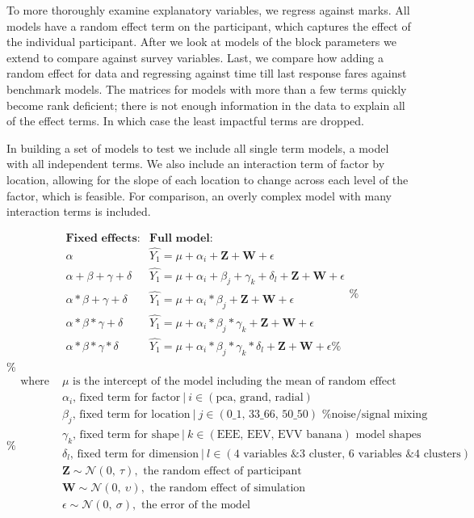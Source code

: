 \documentclass{monashthesis}
\begin{document}
To more thoroughly examine explanatory variables, we regress against marks. All models have a random effect term on the participant, which captures the effect of the individual participant. After we look at models of the block parameters we extend to compare against survey variables. Last, we compare how adding a random effect for data and regressing against time till last response fares against benchmark models. The matrices for models with more than a few terms quickly become rank deficient; there is not enough information in the data to explain all of the effect terms. In which case the least impactful terms are dropped.

In building a set of models to test we include all single term models, a model with all independent terms. We also include an interaction term of factor by location, allowing for the slope of each location to change across each level of the factor, which is feasible. For comparison, an overly complex model with many interaction terms is included.

\[
\begin{array}{ll}
\textbf{Fixed effects:}          &\textbf{Full model:} \\
\alpha                           &\widehat{Y_1} = \mu + \alpha_i + \textbf{Z} + \textbf{W} + \epsilon \\
\alpha + \beta + \gamma + \delta &\widehat{Y_1} = \mu + \alpha_i + \beta_j + \gamma_k + \delta_l + \textbf{Z} + \textbf{W} + \epsilon \\
\alpha * \beta + \gamma + \delta &\widehat{Y_1} = \mu + \alpha_i * \beta_j + \textbf{Z} + \textbf{W} + \epsilon \\
\alpha * \beta * \gamma + \delta &\widehat{Y_1} = \mu + \alpha_i * \beta_j * \gamma_k + \textbf{Z} + \textbf{W} + \epsilon \\
\alpha * \beta * \gamma * \delta &\widehat{Y_1} = \mu + \alpha_i * \beta_j * \gamma_k * \delta_l + \textbf{Z} + \textbf{W} + \epsilon
\% \end{array}
\% \]
\% \[
\% \begin{array}{ll}
\text{where } &\mu \text{ is the intercept of the model including the mean of random effect} \\
&\alpha_i \text{, fixed term for factor}~|~i\in (\text{pca, grand, radial}) \\
&\beta_j  \text{, fixed term for location}~|~j\in (\text{0\_1, 33\_66, 50\_50}) \text{ \% noise/signal mixing} \\
&\gamma_k \text{, fixed term for shape}~|~k\in (\text{EEE, EEV, EVV banana}) \text{ model shapes} \\
&\delta_l \text{, fixed term for dimension}~|~l\in (\text{4 variables \& 3 cluster, 6 variables \& 4 clusters}) \\
&\textbf{Z} \sim \mathcal{N}(0,~\tau), \text{ the random effect of participant} \\
&\textbf{W} \sim \mathcal{N}(0,~\upsilon), \text{ the random effect of simulation} \\
&\epsilon   \sim \mathcal{N}(0,~\sigma), \text{ the error of the model} \\
\end{array}
\]
\end{document}
